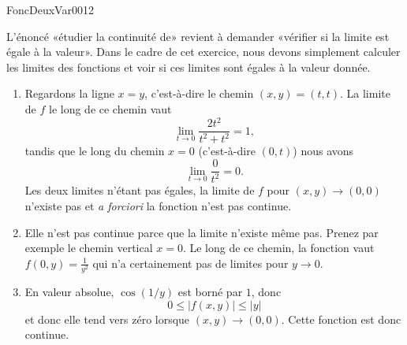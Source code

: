 

\begin{corrige}{FoncDeuxVar0012}

	L'énoncé «étudier la continuité de» revient à demander «vérifier si la limite est égale à la valeur». Dans le cadre de cet exercice, nous devons simplement calculer les limites des fonctions et voir si ces limites sont égales à la valeur donnée.

	\begin{enumerate}

		\item
			Regardons la ligne $x=y$, c'est-à-dire le chemin $(x,y)=(t,t)$. La limite de $f$ le long de ce chemin vaut
			\begin{equation}
				\lim_{t\to 0}\frac{ 2t^2 }{ t^2+t^2 }=1,
			\end{equation}
			tandis que le long du chemin $x=0$ (c'est-à-dire $(0,t)$) nous avons
			\begin{equation}
				\lim_{t\to 0}\frac{ 0 }{ t^2 }=0.
			\end{equation}
			Les deux limites n'étant pas égales, la limite de $f$ pour $(x,y)\to (0,0)$ n'existe pas et \emph{a forciori} la fonction n'est pas continue.
		\item
			Elle n'est pas continue parce que la limite n'existe même pas. Prenez par exemple le chemin vertical $x=0$. Le long de ce chemin, la fonction vaut $f(0,y)=\frac{1}{ y^2 }$ qui n'a certainement pas de limites pour $y\to 0$.

		\item
			En valeur absolue, $\cos(1/y)$ est borné par $1$, donc 
			\begin{equation}
				0\leq | f(x,y) |\leq | y |
			\end{equation}
			et donc elle tend vers zéro lorsque $(x,y)\to(0,0)$. Cette fonction est donc continue.

	\end{enumerate}

\end{corrige}

